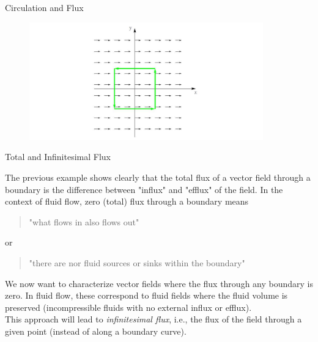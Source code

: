 \documentclass[smaller,hyperref={CJKbookmarks=true}]{beamer}
\begin{document}
\begin{frame}{Circulation and Flux}
\begin{spacing}{1.2}
\begin{figure}
  \centering
  \includegraphics[width=0.9\textwidth]{69.jpg}

\end{figure}
\end{spacing}
\end{frame}
\begin{frame}[t]{Total and Infinitesimal Flux}
\begin{spacing}{1.2}
The previous example shows clearly that the total flux of a vector field
through a boundary is the dif{}ference between "influx" and "ef{}flux" of the
field. In the context of fluid flow, zero (total) flux through a boundary
means
\begin{quote}
  "what flows in also flows out"
\end{quote}
or
\begin{quote}
  "there are nor fluid sources or sinks within the boundary"
\end{quote}
We now want to characterize vector fields where the flux through any
boundary is zero. In fluid flow, these correspond to fluid fields where the
fluid volume is preserved (incompressible fluids with no external influx or
ef{}flux).\\[5pt]
This approach will lead to \emph{infinitesimal flux}, i.e., the flux of the field
through a given point (instead of along a boundary curve).
\end{spacing}
\end{frame}
\end{document}

